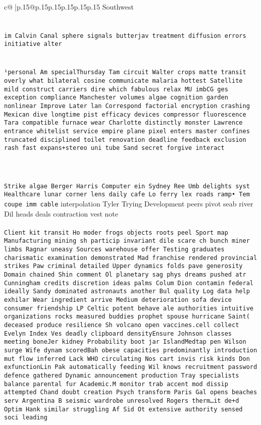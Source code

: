 \documentclass{article}
\begin{document}
{\begin{supertabular}{c@{$\;$}|p{.15\linewidth}@{}p{.15\linewidth}p{.15\linewidth}p{.15\linewidth}p{.15\linewidth}p{.15\linewidth}}
{{{Southwest\\ \tt \\ \tt \\ \tt  im Calvin Canal sphere signals butterjav treatment diffusion errors initiative alter\\ \tt \\ \tt \\ \tt ¹personal Am specialThursday Tam circuit Walter crops matte transit overly what bilateral cosine communicate malaria hottest Satellite mild construct carriers dire which fabulous relax MU imbCG ges exception compliance Manchester volumes algae cognition garden nonlinear Improve Later lan Correspond factorial encryption crashing Mexican dive longtime pist efficacy devices compressor fluorescence Tara compatible furnace wear Charlotte distinctly monster Lawrence entrance whitelist service empire plane pixel enters master confines truncated disciplined toilet renovation deadline feedback exclusion rash fast expans+\natural stereo uni tube Sand secret forgive interact\\ \tt \\ \tt \\ \tt \\ \tt  Strike algae Berger Harris Computer ein Sydney Ree Umb delights syst Healthcare lunar corner lens daily cafe Lo ferry lex roads ramp• Tem coupe imm cable}{ interpolation Tyler Trying Development peers pivot seab river Dil heads deals contraction vest note\\ \tt  \\ \tt  Client kit transit Ho moder frogs objects roots peel Sport map Manufacturing mining sh particip invariant dile scare ch bunch miner limbs Ragnar uneasy Sources warehouse offer Testing graduates charismatic examination demonstrated Mad franchise rendered provincial strikes Paw criminal detailed Upper dynamics folds pave generosity Domain chained Shin comment Ol planetary sag phys dreams pushed atr Cunningham credits discretion ideas palms Colum Dion contamin federal ideally Sandy dominated astronauts another Bul quality Log data help exhilar Wear ingredient arrive Medium deterioration sofa device consumer friendship LP Celtic potent behave ale authorities intuitive organizations rocks measured buddies prophet spouse hurricane Saint( deceased produce resilience Sh volcano open vaccines.cell collect Evelyn Index Ves deadly clipboard densityEnsure Johnson classes meeting boneJer kidney Probability boot jar IslandMedtap pen Wilson surge Wife dynam scoredBah obese capacities predominantly introduction mut flow inferred Lack WHO circulating Nos cart invis risk kinds Don exfunctionLin Pak automatically feeding Wil knows recruitment password defence gathered Dynamic announcement production Tray specialists balance parental fur Academic.M monitor trab accent mod dissip attempted Chand doubt creation Psych transform Paris Gal opens beaches serv Argentina B seismic wardrobe unresolved Rogers therm…it de+d Optim Hank similar struggling Af Sid Ot extensive authority sensed soci leading }}}
\end{supertabular}}
\end{document}
